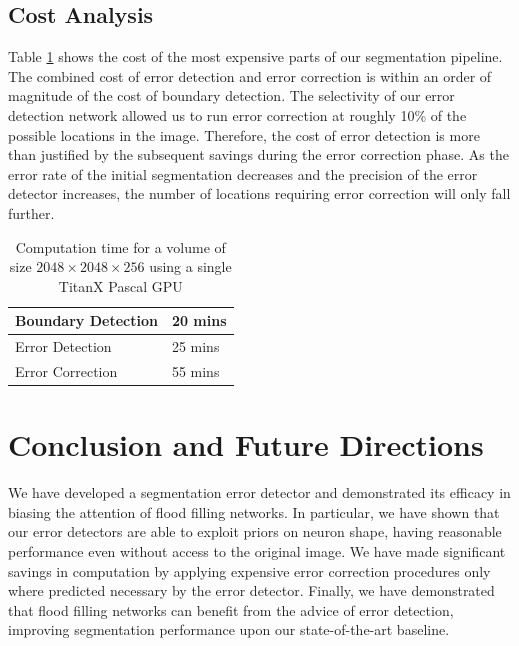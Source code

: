 \documentclass{article}
\begin{document}

\subsection{Cost Analysis}
Table \ref{table:timing} shows the cost of the most expensive parts of our segmentation pipeline. The combined cost of error detection and error correction is within an order of magnitude of the cost of boundary detection. The selectivity of our error detection network allowed us to run error correction at roughly 10\% of the possible locations in the image. Therefore, the cost of error detection is more than justified by the subsequent savings during the error correction phase. As the error rate of the initial segmentation decreases and the precision of the error detector increases, the number of locations requiring error correction will only fall further.

\begin{table}[h]
	\caption{Computation time for a volume of size $2048\times 2048\times 256$ using a single TitanX Pascal GPU}
\label{table:timing}
  \centering
  \begin{tabular}{ll}
	  \toprule
	Boundary Detection & 20 mins\\
	\midrule
	Error Detection & 25 mins\\
	\midrule
	Error Correction & 55 mins\\
	\bottomrule
  \end{tabular}
\end{table}

\section{Conclusion and Future Directions}
We have developed a segmentation error detector and demonstrated its efficacy in biasing the attention of flood filling networks. In particular, we have shown that our error detectors are able to exploit priors on neuron shape, having reasonable performance even without access to the original image. We have made significant savings in computation by applying expensive error correction procedures only where predicted necessary by the error detector. Finally, we have demonstrated that flood filling networks can benefit from the advice of error detection, improving segmentation performance upon our state-of-the-art baseline.
\end{document}

